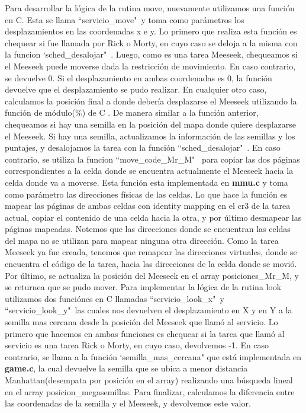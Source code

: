 \documentclass[a4paper]{article}
\begin{document}
Para desarrollar la lógica de la rutina move, nuevamente utilizamos una función en C. Esta se llama ``servicio_move"\ y toma como parámetros los desplazamientos en las coordenadas x e y. Lo primero que realiza esta función es chequear si fue llamada por Rick o Morty, en cuyo caso se deloja a la misma con la funcion `sched_desalojar"\ . Luego, como es una tarea Meeseek, chequeamos si el Meeseek puede moverse dada la restricción de movimiento. En caso contrario, se devuelve 0. Si el desplazamiento en ambas coordenadas es 0, la función devuelve que el desplazamiento se pudo realizar. En cualquier otro caso, calculamos la posición final a donde debería desplazarse el Meeseek utilizando la función de módulo(\%) de C . De manera similar a la función anterior, chequeamos si hay una semilla en la posición del mapa donde quiere desplazarse el Meeseek. Si hay una semilla, actualizamos la información de las semillas y los puntajes, y desalojamos la tarea con la función ``sched_desalojar"\ . En caso contrario, se utiliza la funcion ``move_code_Mr_M" \ para copiar las dos páginas correspondientes a la celda donde se encuentra actualmente el Meeseek hacia la celda donde va a moverse. Esta función esta implementada en \textbf{mmu.c} y toma como parámetro las direcciones físicas de las celdas. Lo que hace la función es mapear las páginas de ambas celdas con identity mapping en el cr3 de la tarea actual, copiar el contenido de una celda hacia la otra, y por último desmapear las páginas mapeadas. Notemos que las direcciones donde se encuentran las celdas del mapa no se utilizan para mapear ninguna otra dirección. Como la tarea Meeseek ya fue creada, tenemos que remapear las direcciones virtuales, donde se encuentra el código de la tarea, hacia las direcciones de la celda donde se movió. Por último, se actualiza la posición del Meeseek en el array posiciones_Mr_M, y se returnea que se pudo mover.
\justify
Para implementar la lógica de la rutina look utilizamos dos funciónes en C llamadas ``servicio_look_x"\ y ``servicio_look_y"\ las cuales nos devuelven el desplazamiento en X y en Y a la semilla mas cercana desde la posición del Meeseek que llamó al servicio. Lo primero que hacemos en ambas funciones es chequear si la tarea que llamó al servicio es una tarea Rick o Morty, en cuyo caso, devolvemos -1. En caso contrario, se llama a la función `semilla_mas_cercana" que está implementada en \textbf{game.c}, la cual devuelve la semilla que se ubica a menor distancia Manhattan(desempata por posición en el array) realizando una búsqueda lineal en el array posicion_megasemillas. Para finalizar, calculamos la diferencia entre las coordenadas de la semilla y el Meeseek, y devolvemos este valor.
\end{document}
